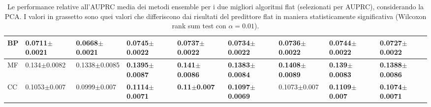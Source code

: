 \documentclass[12pt]{report}
\begin{document}
\begin{appendices}
\begin{table}
{\begin{subtable}[t]{0.4\textwidth}
\begin{tabular}{|l|l|l|l|l|l|l|l|l|}
BP&\footnotesize{0.0711$\pm$0.0021}&\footnotesize{0.0668$\pm$0.0021}& \textbf{\footnotesize{0.0745$\pm$0.0022}} & \textbf{\footnotesize{0.0737$\pm$0.0022}} & \textbf{\footnotesize{0.0734$\pm$0.0022}} & \textbf{\footnotesize{0.0736$\pm$0.0022}} & \textbf{\footnotesize{0.0744$\pm$0.0022}} & \textbf{\footnotesize{0.0727$\pm$0.0022}} \\ \hline
MF&\footnotesize{0.134$\pm$0.0082}&\footnotesize{0.1338$\pm$0.0085}& \textbf{\footnotesize{0.1395$\pm$0.0087}} & \textbf{\footnotesize{0.141$\pm$0.0086}} & \textbf{\footnotesize{0.1383$\pm$0.0084}} & \textbf{\footnotesize{0.1408$\pm$0.0089}} & \textbf{\footnotesize{0.139$\pm$0.0083}} & \textbf{\footnotesize{0.1388$\pm$0.0086}} \\ \hline
CC&\footnotesize{0.1053$\pm$0.007}&\footnotesize{0.0999$\pm$0.007}& \textbf{\footnotesize{0.1114$\pm$0.0071}} & \textbf{\footnotesize{0.11$\pm$0.007}} & \textbf{\footnotesize{0.1097$\pm$0.0069}} &\footnotesize{0.1073$\pm$0.007}& \textbf{\footnotesize{0.1109$\pm$0.007}} & \textbf{\footnotesize{0.1074$\pm$0.0071}} \\ \hline\end{tabular}
                    \label{table1}
                    \end{subtable}}
\caption{\footnotesize{Le performance relative all'AUPRC media dei metodi ensemble per i due migliori algoritmi flat (selezionati per AUPRC), considerando la PCA. I valori in grassetto sono quei valori che differiscono dai risultati del predittore flat in maniera statisticamente significativa (Wilcoxon rank sum test con $\alpha = 0.01$).}}
\label{best_auprc_pca}             
\end{table}



\begin{table}[h!]

\hspace*{-0.45in}
\end{table}
\end{appendices}
\end{document}
